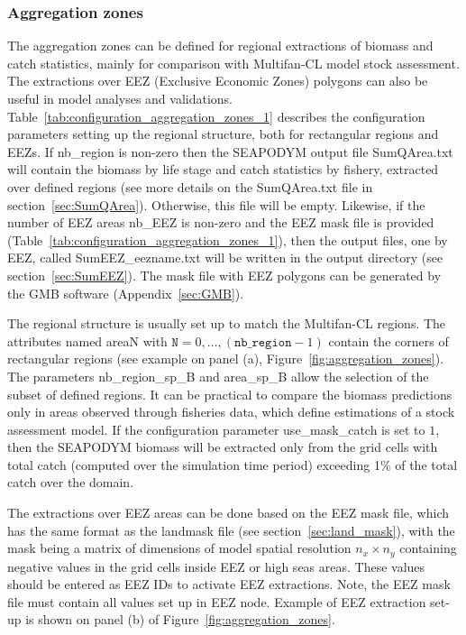 \subsubsection{Aggregation zones}
\label{sec:aggregation}

The aggregation zones can be defined for regional extractions of biomass and catch statistics, mainly for comparison with Multifan-CL model stock assessment. The extractions over EEZ (Exclusive Economic Zones) polygons can also be useful in model analyses and validations. Table~\ref{tab:configuration_aggregation_zones_1} describes the configuration parameters setting up the regional structure, both for rectangular regions and EEZs. If {\ttfamily nb\_region} is non-zero then the SEAPODYM output file SumQArea.txt will contain the biomass  by life stage and catch statistics by fishery, extracted over defined regions (see more details on the SumQArea.txt file in section~\ref{sec:SumQArea}). Otherwise, this file will be empty. Likewise, if the number of EEZ areas {\ttfamily nb\_EEZ} is non-zero and the EEZ mask file is provided (Table~\ref{tab:configuration_aggregation_zones_1}), then the output files, one by EEZ, called SumEEZ\_eezname.txt will be written in the output directory (see section~\ref{sec:SumEEZ}). The mask file with EEZ polygons can be generated by the GMB software (Appendix~\ref{sec:GMB}).

The regional structure is usually set up to match the Multifan-CL regions. The attributes named {\ttfamily areaN} with $\texttt{N}=0,\dots,\left(\texttt{nb\_region}-1\right)$ contain the corners of rectangular regions (see example on panel (a), Figure~\ref{fig:aggregation_zones}). The parameters {\ttfamily nb\_region\_sp\_B} and {\ttfamily area\_sp\_B} allow the selection of the subset of defined regions. It can be practical to compare the biomass predictions only in areas observed through fisheries data, which define estimations of a stock assessment model. If the configuration parameter {\ttfamily use\_mask\_catch} is set to $1$, then the SEAPODYM biomass will be extracted only from the grid cells with total catch (computed over the simulation time period) exceeding 1\% of the total catch over the domain.   

The extractions over EEZ areas can be done based on the EEZ mask file, which has the same format as the landmask file (see section~\ref{sec:land_mask}), with the mask being a matrix of dimensions of model spatial resolution $n_x \times n_y$ containing negative values in the grid cells inside EEZ or high seas areas. These values should be entered as EEZ IDs to activate EEZ extractions. Note, the EEZ mask file must contain all values set up in {\ttfamily EEZ} node. Example of EEZ extraction set-up is shown on panel (b) of Figure~\ref{fig:aggregation_zones}.

